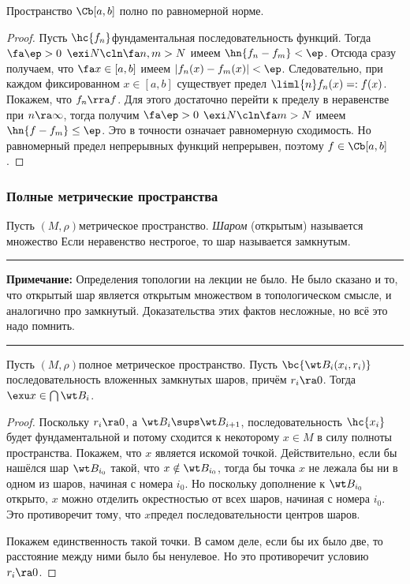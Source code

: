\documentclass[a4paper]{article}
\newcommand{\comment}[1]{\par\vskip2pt\hrule\vskip2pt{\footnotesize \textbf{Примечание:} #1\par}\vskip2pt\hrule\vskip2pt}
\begin{document}
\begin{theorem}
Пространство $\Cb[a,b]$ полно по равномерной норме.
\end{theorem}
\begin{proof}
Пусть $\hc{f_n}$\т фундаментальная последовательность функций.
Тогда $\fa \ep > 0$ $\exi N\cln \fa n, m > N$ имеем $\hn{f_n - f_m} < \ep$.
Отсюда сразу получаем, что $\fa x \in [a,b]$ имеем $|f_n(x) - f_m(x)| < \ep$.
Следовательно, при каждом фиксированном $x \in [a,b]$ существует
предел $\liml{n} f_n(x) =: f(x)$. Покажем, что $f_n \rra f$. Для этого достаточно перейти
к пределу в неравенстве при $n \ra \infty$, тогда получим
$\fa \ep > 0$ $\exi N\cln \fa m > N$ имеем $\hn{f - f_m} \le \ep$.
Это в точности означает равномерную сходимость. Но равномерный предел непрерывных функций непрерывен,
поэтому $f \in \Cb[a,b]$.
\end{proof}

\subsubsection{Полные метрические пространства}

\begin{df}
Пусть $(M, \rho)$\т метрическое пространство. \emph{Шаром} (открытым) называется множество
Если неравенство нестрогое, то шар называется замкнутым.
\end{df}

\comment{Определения топологии на лекции не было. Не было сказано и то, что открытый шар
является открытым множеством в топологическом смысле, и аналогично про замкнутый.
Доказательства этих фактов несложные, но всё это надо помнить.}

\begin{theorem}
Пусть $(M, \rho)$\т полное метрическое пространство.
Пусть $\bc{\wt B_i(x_i, r_i)}$\т последовательность вложенных замкнутых шаров, причём $r_i \ra 0$.
Тогда $\exu x \in \bigcap \wt B_i$.
\end{theorem}
\begin{proof}
Поскольку $r_i \ra 0$, а $\wt B_i \sups \wt B_{i+1}$, последовательность $\hc{x_i}$ будет
фундаментальной и потому сходится
к некоторому $x \in M$ в силу полноты пространства. Покажем, что $x$ является искомой точкой.
Действительно, если бы нашёлся шар $\wt B_{i_0}$ такой, что $x \notin \wt B_{i_0}$, тогда бы
точка $x$ не лежала бы ни в одном из шаров, начиная с номера $i_0$. Но поскольку дополнение к $\wt B_{i_0}$
открыто, $x$ можно отделить окрестностью от всех шаров, начиная с номера $i_0$. Это противоречит тому,
что $x$\т предел последовательности центров шаров.

Покажем единственность такой точки. В самом деле, если бы их было две, то расстояние между ними было бы
ненулевое. Но это противоречит условию $r_i \ra 0$.
\end{proof}
\end{document}
